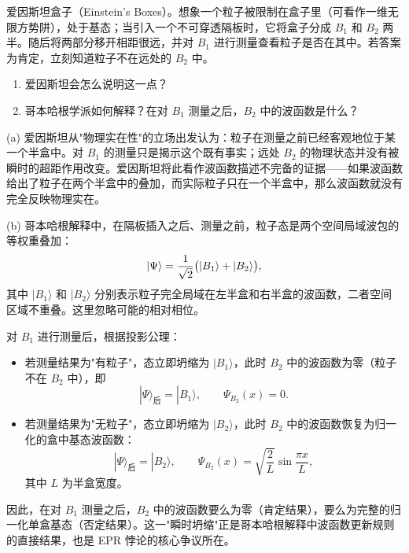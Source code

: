 \begin{question}
爱因斯坦盒子（Einstein's Boxes）。想象一个粒子被限制在盒子里（可看作一维无限方势阱），处于基态；当引入一个不可穿透隔板时，它将盒子分成 $B_1$ 和 $B_2$ 两半。随后将两部分移开相距很远，并对 $B_1$ 进行测量查看粒子是否在其中。若答案为肯定，立刻知道粒子不在远处的 $B_2$ 中。
\begin{enumerate}
\item 爱因斯坦会怎么说明这一点？
\item 哥本哈根学派如何解释？在对 $B_1$ 测量之后，$B_2$ 中的波函数是什么？
\end{enumerate}
\end{question}
\begin{solution}
(a) 爱因斯坦从"物理实在性"的立场出发认为：粒子在测量之前已经客观地位于某一个半盒中。对 $B_1$ 的测量只是揭示这个既有事实；远处 $B_2$ 的物理状态并没有被瞬时的超距作用改变。爱因斯坦将此看作波函数描述不完备的证据——如果波函数给出了粒子在两个半盒中的叠加，而实际粒子只在一个半盒中，那么波函数就没有完全反映物理实在。

(b) 哥本哈根解释中，在隔板插入之后、测量之前，粒子态是两个空间局域波包的等权重叠加：
\[
|\Psi\rangle={1\over\sqrt2}\bigl(|B_1\rangle+|B_2\rangle\bigr),
\]
其中 $|B_1\rangle$ 和 $|B_2\rangle$ 分别表示粒子完全局域在左半盒和右半盒的波函数，二者空间区域不重叠。这里忽略可能的相对相位。

对 $B_1$ 进行测量后，根据投影公理：
\begin{itemize}
\item 若测量结果为"有粒子"，态立即坍缩为 $|B_1\rangle$，此时 $B_2$ 中的波函数为零（粒子不在 $B_2$ 中），即
\[
|\Psi\rangle_{\text{后}} = |B_1\rangle,\qquad \Psi_{B_2}(x)=0.
\]
\item 若测量结果为"无粒子"，态立即坍缩为 $|B_2\rangle$，此时 $B_2$ 中的波函数恢复为归一化的盒中基态波函数：
\[
|\Psi\rangle_{\text{后}} = |B_2\rangle,\qquad \Psi_{B_2}(x) = \sqrt{\frac{2}{L}}\sin\frac{\pi x}{L},
\]
其中 $L$ 为半盒宽度。
\end{itemize}

因此，在对 $B_1$ 测量之后，$B_2$ 中的波函数要么为零（肯定结果），要么为完整的归一化单盒基态（否定结果）。这一"瞬时坍缩"正是哥本哈根解释中波函数更新规则的直接结果，也是 EPR 悖论的核心争议所在。
\end{solution}

